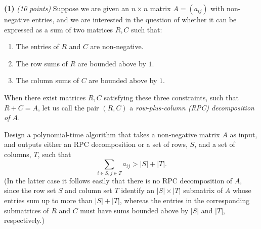 \documentclass[11pt]{article}
\def\bigap{0.25in}
\begin{document}
\setlength{\parindent}{0in}
\addtolength{\parskip}{0.1cm}
\setlength{\fboxrule}{.5mm}\setlength{\fboxsep}{1.2mm}
\newlength{\boxlength}\setlength{\boxlength}{\textwidth}
\addtolength{\boxlength}{-4mm}
\begin{center}
\end{center}
\vspace{5mm}

{ \bf (1)} {\em (10 points)}
Suppose we are given an $n \times n$ matrix $A = (a_{ij})$ with
non-negative entries, 
and we are interested in the question of whether it can
be expressed as a sum of two matrices $R, C$ such that:
\begin{enumerate}
\item  \label{cond1}
The entries of $R$ and $C$ are non-negative.
\item  \label{cond2}
The row sums of $R$ are bounded above by $1$.
\item  \label{cond3}
The column sums of $C$ are bounded above by $1$.
\end{enumerate}
When there exist matrices $R,C$ satisfying these
three constraints, such that $R+C=A$, let us call
the pair $(R,C)$ a \emph{row-plus-column (RPC) decomposition
of $A$.}

Design a polynomial-time algorithm that takes
a non-negative matrix $A$ as input, and outputs either
an RPC decomposition or a set of rows, $S$, and a set
of columns, $T$, such that 
\[
  \sum_{i \in S, j \in T} a_{ij} > |S| + |T|.
\]
(In the latter case it follows easily that
there is no RPC decomposition of $A$, since 
the row set $S$ and column set $T$ identify an 
$|S| \times |T|$ submatrix of $A$ whose entries
sum up to more than $|S|+|T|$, whereas the 
entries in the corresponding submatrices of $R$
and $C$ must have sums bounded above by $|S|$
and $|T|$, respectively.)

\vskip \bigap

\end{document}
